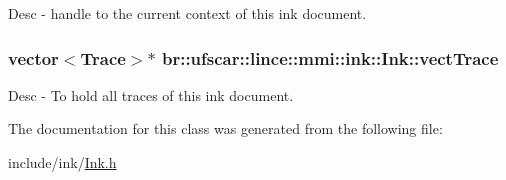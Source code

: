 Desc -\/ handle to the current context of this ink document. 

\hypertarget{classbr_1_1ufscar_1_1lince_1_1mmi_1_1ink_1_1Ink_a9dee6cfd152a6de770ac10b40e761ef8}{
\subsubsection[{vectTrace}]{\setlength{\rightskip}{0pt plus 5cm}vector$<${\bf Trace}$>$$\ast$ {\bf br::ufscar::lince::mmi::ink::Ink::vectTrace}}}
\label{classbr_1_1ufscar_1_1lince_1_1mmi_1_1ink_1_1Ink_a9dee6cfd152a6de770ac10b40e761ef8}


Desc -\/ To hold all traces of this ink document. 



The documentation for this class was generated from the following file:\begin{DoxyCompactItemize}
\item 
include/ink/\hyperlink{Ink_8h}{Ink.h}\end{DoxyCompactItemize}
